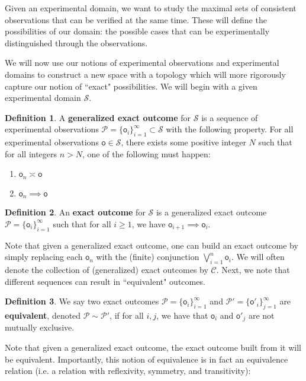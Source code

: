 \documentclass[review]{elsarticle}
\theoremstyle{plain}%
\theoremstyle{definition}
\newtheorem{defn}{Definition}[section]
\theoremstyle{remark}
\begin{document}
Given an experimental domain, we want to study the maximal sets of consistent observations that can be verified at the same time. These will define the possibilities of our domain: the possible cases that can be experimentally distinguished through the observations.


We will now use our notions of experimental observations and experimental domains to construct a new space with a topology which will more rigorously capture our notion of ``exact" possibilities. We will begin with a given experimental domain $\mathcal{S}$. 

\begin{defn}
A \textbf{generalized exact outcome} for $\mathcal{S}$ is a sequence of experimental observations $\mathcal{P} = \{\mathsf{o}_i\}_{i=1}^{\infty}\subset\mathcal{S}$ with the following property. For all experimental observations $\mathsf{o}\in\mathcal{S}$, there exists some positive integer $N$ such that for all integers $n>N$, one of the following must happen:
\begin{enumerate}
\item $\mathsf{o}_n \asymp \mathsf{o}$ 
\item $\mathsf{o}_n \implies \mathsf{o}$
\end{enumerate}
\end{defn}

\begin{defn}
An \textbf{exact outcome} for $\mathcal{S}$ is a generalized exact outcome $\mathcal{P} = \{\mathsf{o}_i\}_{i=1}^{\infty}$ such that for all $i\geq1$, we have $\mathsf{o}_{i+1}\implies\mathsf{o}_i$.
\end{defn}
Note that given a generalized exact outcome, one can build an exact outcome by simply replacing each $\mathsf{o}_n$ with the (finite) conjunction $\bigvee_{i=1}^n\mathsf{o}_i$. We will often denote the collection of (generalized) exact outcomes by $\mathcal{C}$. Next, we note that different sequences can result in ``equivalent" outcomes. 

\begin{defn}
We say two exact outcomes $\mathcal{P} = \{\mathsf{o}_i\}_{i=1}^{\infty}$ and $\mathcal{P}' = \{\mathsf{o}'_i\}_{j=1}^{\infty}$ are \textbf{equivalent}, denoted $\mathcal{P}\sim\mathcal{P}'$, if for all $i,j$, we have that $\mathsf{o}_i$ and $\mathsf{o}'_j$ are not mutually exclusive. 
\end{defn}

Note that given a generalized exact outcome, the exact outcome built from it will be equivalent. Importantly, this notion of equivalence is in fact an equivalence relation (i.e. a relation with reflexivity, symmetry, and transitivity):
\end{document}
